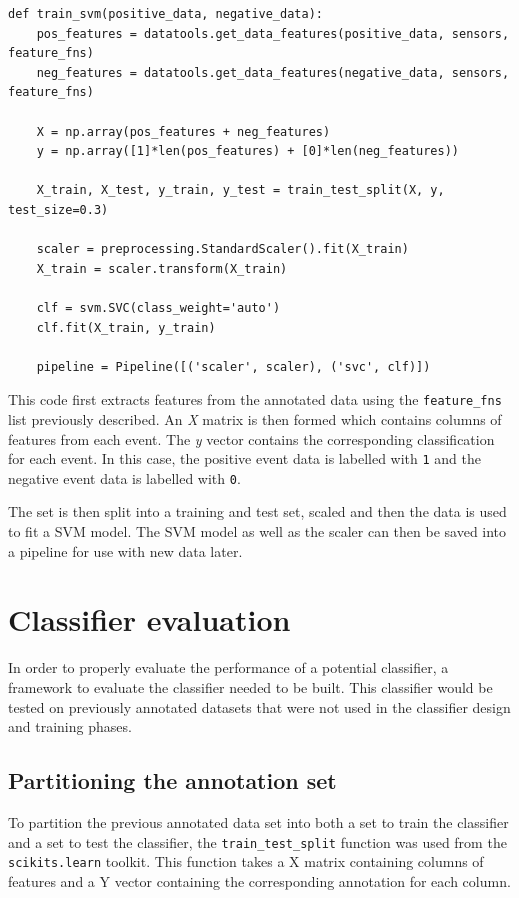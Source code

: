 \begin{verbatim}
def train_svm(positive_data, negative_data):
    pos_features = datatools.get_data_features(positive_data, sensors, feature_fns)
    neg_features = datatools.get_data_features(negative_data, sensors, feature_fns)
    
    X = np.array(pos_features + neg_features)
    y = np.array([1]*len(pos_features) + [0]*len(neg_features))
    
    X_train, X_test, y_train, y_test = train_test_split(X, y, test_size=0.3)
    
    scaler = preprocessing.StandardScaler().fit(X_train)
    X_train = scaler.transform(X_train)
    
    clf = svm.SVC(class_weight='auto')
    clf.fit(X_train, y_train) 
    
    pipeline = Pipeline([('scaler', scaler), ('svc', clf)])
\end{verbatim}


This code first extracts features from the annotated data using the \texttt{feature\_fns} list previously described. An \textit{X} matrix is then formed which contains columns of features from each event. The \textit{y} vector contains the corresponding classification for each event. In this case, the positive event data is labelled with \texttt{1} and the negative event data is labelled with \texttt{0}.

The set is then split into a training and test set, scaled and then the data is used to fit a SVM model. The SVM model as well as the scaler can then be saved into a pipeline for use with new data later.  

\section{Classifier evaluation}
In order to properly evaluate the performance of a potential classifier, a framework to evaluate the classifier needed to be built. This classifier would be tested on previously annotated datasets that were not used in the classifier design and training phases. 

\subsection{Partitioning the annotation set}
To partition the previous annotated data set into both a set to train the classifier and a set to test the classifier, the \texttt{train\_test\_split} function was used from the \texttt{scikits.learn} toolkit. This function takes a X matrix containing columns of features and a Y vector containing the corresponding annotation for each column. 

